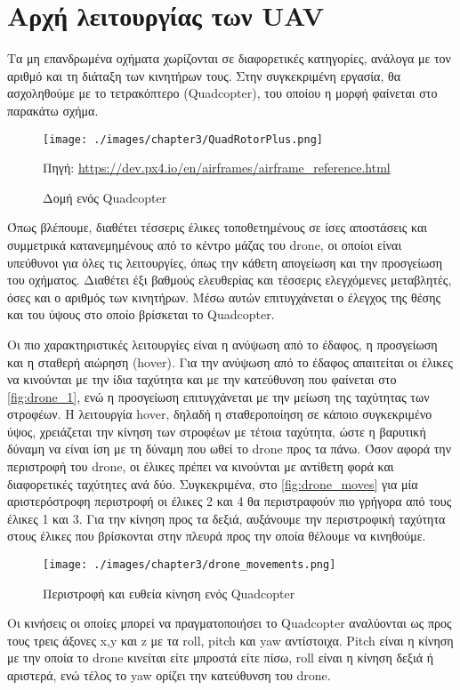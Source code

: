 \section{Αρχή λειτουργίας των UAV}
\label{section:quadcopter}

Τα μη επανδρωμένα οχήματα χωρίζονται σε διαφορετικές κατηγορίες, ανάλογα με τον αριθμό και τη διάταξη των κινητήρων τους. Στην συγκεκριμένη εργασία, θα ασχοληθούμε με το τετρακόπτερο (Quadcopter), του οποίου η μορφή φαίνεται στο παρακάτω σχήμα.
\begin{figure}[!ht]
    \centering
    \texttt{[image: ./images/chapter3/QuadRotorPlus.png]}
    \caption{Δομή ενός Quadcopter} 
    Πηγή: \href{https://dev.px4.io/en/airframes/airframe\_reference.html}{https://dev.px4.io/en/airframes/airframe\_reference.html}
    \label{fig:drone_1}
\end{figure}

Όπως βλέπουμε, διαθέτει τέσσερις έλικες τοποθετημένους σε ίσες αποστάσεις και συμμετρικά κατανεμημένους από το κέντρο μάζας του drone, οι οποίοι είναι υπεύθυνοι για όλες τις λειτουργίες, όπως την κάθετη απογείωση και την προσγείωση του οχήματος. Διαθέτει έξι βαθμούς ελευθερίας και τέσσερις ελεγχόμενες μεταβλητές, όσες και ο αριθμός των κινητήρων. Μέσω αυτών επιτυγχάνεται ο έλεγχος της θέσης και του ύψους στο οποίο βρίσκεται το Quadcopter. 

Οι πιο χαρακτηριστικές λειτουργίες είναι η ανύψωση από το έδαφος, η προσγείωση και η σταθερή αιώρηση (hover). Για την ανύψωση από το έδαφος απαιτείται οι έλικες να κινούνται με την ίδια ταχύτητα και με την κατεύθυνση που φαίνεται στο \autoref{fig:drone_1}, ενώ η προσγείωση επιτυγχάνεται με την μείωση της ταχύτητας των στροφέων. Η λειτουργία hover, δηλαδή η σταθεροποίηση σε κάποιο συγκεκριμένο ύψος, χρειάζεται την κίνηση των στροφέων με τέτοια ταχύτητα, ώστε η βαρυτική δύναμη να είναι ίση με τη δύναμη που ωθεί το drone προς τα πάνω. Όσον αφορά την περιστροφή του drone, οι έλικες πρέπει να κινούνται με αντίθετη φορά και διαφορετικές ταχύτητες ανά δύο. Συγκεκριμένα, στο \autoref{fig:drone_moves} για μία αριστερόστροφη περιστροφή οι έλικες 2 και 4 θα περιστραφούν πιο γρήγορα από τους έλικες 1 και 3. Για την κίνηση προς τα δεξιά, αυξάνουμε την περιστροφική ταχύτητα στους έλικες που βρίσκονται στην πλευρά προς την οποία θέλουμε να κινηθούμε.

\begin{figure}[!ht]
    \centering
    \texttt{[image: ./images/chapter3/drone\_movements.png]}
    \caption{Περιστροφή και ευθεία κίνηση ενός Quadcopter} 
    \label{fig:drone_moves}
\end{figure}

Οι κινήσεις οι οποίες μπορεί να πραγματοποιήσει το Quadcopter αναλύονται ως προς τους τρεις άξονες x,y και z με τα roll, pitch και yaw αντίστοιχα. Pitch είναι η κίνηση με την οποία το drone κινείται είτε μπροστά είτε πίσω, roll είναι η κίνηση δεξιά ή αριστερά, ενώ τέλος το yaw ορίζει την κατεύθυνση του drone.